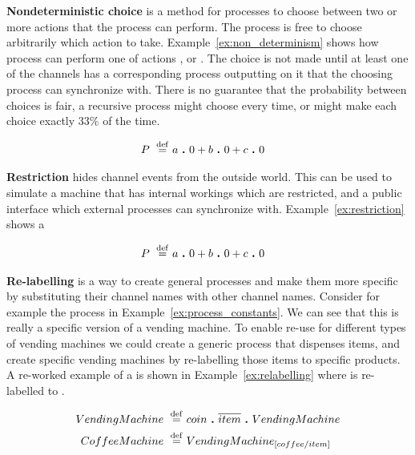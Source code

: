 	\textbf{Nondeterministic choice} is a method for processes to choose between two or more actions that the process can perform. The process is free to choose arbitrarily which action to take. Example~\ref{ex:non_determinism} shows how process  can perform one of actions ,  or . The choice is not made until at least one of the channels has a corresponding process outputting on it that the choosing process can synchronize with. There is no guarantee that the probability between choices is fair, a recursive process might choose  every time, or might make each choice exactly 33\% of the time.
	
	\begin{Exa}\label{ex:process_constants}
	\begin{align*}
			P \ \stackrel{\mathrm{def}}{=}\  & a \ \textbf{.}\  0 + b \ \textbf{.}\  0 + c \ \textbf{.}\  0
	\end{align*}	
	\end{Exa}
	

	\textbf{Restriction} hides channel events from the outside world. This can be used to simulate a machine that has internal workings which are restricted, and a public interface which external processes can synchronize with. Example~\ref{ex:restriction} shows a 
	
	\begin{Exa}\label{ex:restriction}
	\begin{align*}
			P \ \stackrel{\mathrm{def}}{=}\  & a \ \textbf{.}\  0 + b \ \textbf{.}\  0 + c \ \textbf{.}\  0
	\end{align*}	
	\end{Exa}

	\textbf{Re-labelling} is a way to create general processes and make them more specific by substituting their channel names with other channel names. Consider for example the  process in Example~\ref{ex:process_constants}. We can see that this is really a specific version of a vending machine. To enable re-use for different types of vending machines we could create a generic  process that dispenses items, and create specific vending machines by re-labelling those items to specific products. A re-worked example of a  is shown in Example~\ref{ex:relabelling} where  is re-labelled to .
	
	\begin{Exa}\label{ex:relabelling}
	\begin{align*}
			VendingMachine \ \stackrel{\mathrm{def}}{=}\  & coin \ \textbf{.}\  \overline{item} \ \textbf{.}\  VendingMachine \\
			CoffeeMachine \ \stackrel{\mathrm{def}}{=}\  & VendingMachine_{[coffee/item]}
	\end{align*}	
	\end{Exa}
	
